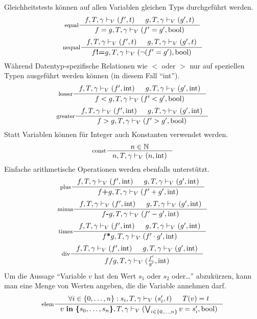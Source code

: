 Gleichheitstests können auf allen Variablen gleichen Typs durchgeführt werden.
\[
\inference[equal]{f,T,\gamma\vdash_V (f',t) & g,T,\gamma\vdash_V (g',t)}{f=g,T,\gamma\vdash_V(f'=g',\textrm{bool})}
\]
\[
\inference[nequal]{f,T,\gamma\vdash_V (f',t) & g,T,\gamma\vdash_V (g',t)}{f\textbf{!=}g,T,\gamma\vdash_V(\lnot(f'=g'),\textrm{bool})}
\]
Während Datentyp-spezifische Relationen wie $<$ oder $>$ nur auf speziellen Typen ausgeführt werden können (in diesem Fall "`int"').
\[
\inference[lesser]{f,T,\gamma\vdash_V (f',\textrm{int}) & g,T,\gamma\vdash_V (g',\textrm{int})}{f<g,T,\gamma\vdash_V(f'<g',\textrm{bool})}
\]
\[
\inference[greater]{f,T,\gamma\vdash_V (f',\textrm{int}) & g,T,\gamma\vdash_V (g',\textrm{int})}{f>g,T,\gamma\vdash_V(f'>g',\textrm{bool})}
\]
Statt Variablen können für Integer auch Konstanten verwendet werden. 
\[
\inference[const]{n\in\mathbb{N}}{n,T,\gamma\vdash_V (n,\textrm{int})}
\]
Einfache arithmetische Operationen werden ebenfalls unterstützt.
\[
\inference[plus]{f,T,\gamma\vdash_V (f',\textrm{int}) & g,T,\gamma\vdash_V (g',\textrm{int})}{f\textbf{+}g,T,\gamma\vdash_V (f'+g',\textrm{int})}
\]
\[
\inference[minus]{f,T,\gamma\vdash_V (f',\textrm{int}) & g,T,\gamma\vdash_V (g',\textrm{int})}{f\textbf{-}g,T,\gamma\vdash_V (f'-g',\textrm{int})}
\]
\[
\inference[times]{f,T,\gamma\vdash_V (f',\textrm{int}) & g,T,\gamma\vdash_V (g',\textrm{int})}{f\textbf{*}g,T,\gamma\vdash_V (f'\cdot g',\textrm{int})}
\]
\[
\inference[div]{f,T,\gamma\vdash_V (f',\textrm{int}) & g,T,\gamma\vdash_V (g',\textrm{int})}{f\textbf{/}g,T,\gamma\vdash_V (\frac{f'}{g'},\textrm{int})}
\]
Um die Aussage "`Variable $v$ hat den Wert $s_1$ oder $s_2$ oder\dots"' abzukürzen, kann man eine Menge von Werten angeben, die die Variable annehmen darf.
\[
\inference[elem]{\forall i\in\{0,\dots,n\}: s_i,T,\gamma\vdash_V (s_i',t) & T(v)=t}{v\ \textbf{in}\ \textbf{\{}s_0,\dots,s_n\textbf{\}},T,\gamma\vdash_V (\bigvee_{i\in\{0,\dots,n\}} v=s_i',\textrm{bool}) }
\]